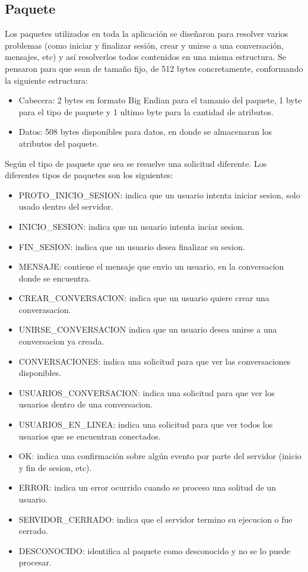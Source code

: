\documentclass[a4paper,12pt,titlepage]{article}
\begin{document}
\subsection{Paquete}
Los paquetes utilizados en toda la aplicación se diseñaron para resolver varios problemas (como iniciar y finalizar sesión, crear y unirse a una 
conversación, mensajes, etc) y así resolverlos todos contenidos en una misma estructura.
Se pensaron para que sean de tamaño fijo, de 512 bytes concretamente, conformando la siguiente estructura:

\begin{itemize}
\item Cabecera: 2 bytes en formato Big Endian para el tamanio del paquete, 1 byte para el tipo de paquete y 1 ultimo byte para la cantidad de atributos.
\item Datos: 508 bytes disponibles para datos, en donde se almacenaran los atributos del paquete.\\
\end{itemize}

Según el tipo de paquete que sea se resuelve una solicitud diferente. Los diferentes tipos de paquetes son los siguientes:
\begin{itemize}
\item PROTO\_INICIO\_SESION: indica que un usuario intenta iniciar sesion, solo usado dentro del servidor.
\item INICIO\_SESION: indica que un usuario intenta inciar sesion.
\item FIN\_SESION: indica que un usuario desea finalizar su sesion.
\item MENSAJE: contiene el mensaje que envio un usuario, en la conversacion donde se encuentra.
\item CREAR\_CONVERSACION: indica que un usuario quiere crear una converasacion.
\item UNIRSE\_CONVERSACION indica que un usuario desea unirse a una conversacion ya creada.
\item CONVERSACIONES: indica una solicitud para que ver las conversaciones disponibles.
\item USUARIOS\_CONVERSACION: indica una solicitud para que ver los usuarios dentro de una conversacion.
\item USUARIOS\_EN\_LINEA: indica una solicitud para que ver todos los usuarios que se encuentran conectados.
\item OK: indica una confirmación sobre algún evento por parte del servidor (inicio y fin de sesion, etc).
\item ERROR: indica un error ocurrido cuando se proceso una solitud de un usuario.
\item SERVIDOR\_CERRADO: indica que el servidor termino su ejecucion o fue cerrado.
\item DESCONOCIDO: identifica al paquete como desconocido y no se lo puede procesar.\\
\end{itemize}
\end{document}
